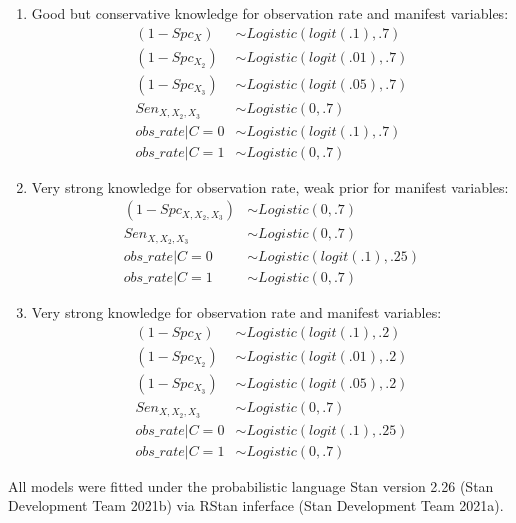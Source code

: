\documentclass[
]{article}
\begin{document}
\begin{enumerate}
\def\labelenumi{\arabic{enumi}.}
\setcounter{enumi}{2}
\item
  Good but conservative knowledge for observation rate and manifest variables:\\
  \[
  \begin{aligned}
  (1-Spc_{X}) &\sim Logistic(logit(.1),.7) \\
  (1-Spc_{X_2}) &\sim Logistic(logit(.01),.7) \\
  (1-Spc_{X_3}) &\sim Logistic(logit(.05),.7) \\
  Sen_{X,X_2,X_3} &\sim Logistic(0,.7) \\
  obs\_rate|{C=0} &\sim Logistic(logit(.1),.7) \\
  obs\_rate|{C=1} &\sim Logistic(0,.7)
  \end{aligned}
  \]
\item
  Very strong knowledge for observation rate, weak prior for manifest variables:\\
  \[
  \begin{aligned}
  (1-Spc_{X,X_2,X_3}) &\sim Logistic(0,.7) \\
  Sen_{X,X_2,X_3} &\sim Logistic(0,.7) \\
  obs\_rate|{C=0} &\sim Logistic(logit(.1),.25) \\
  obs\_rate|{C=1} &\sim Logistic(0,.7)
  \end{aligned}
  \]
\item
  Very strong knowledge for observation rate and manifest variables:\\
  \[
  \begin{aligned}
  (1-Spc_{X}) &\sim Logistic(logit(.1),.2) \\
  (1-Spc_{X_2}) &\sim Logistic(logit(.01),.2) \\
  (1-Spc_{X_3}) &\sim Logistic(logit(.05),.2) \\
  Sen_{X,X_2,X_3} &\sim Logistic(0,.7) \\
  obs\_rate|{C=0} &\sim Logistic(logit(.1),.25) \\
  obs\_rate|{C=1} &\sim Logistic(0,.7)
  \end{aligned}
  \]
\end{enumerate}

All models were fitted under the probabilistic language \textsf{Stan} version 2.26 (Stan Development Team 2021b) via \textsf{RStan} inferface (Stan Development Team 2021a).
\end{document}
